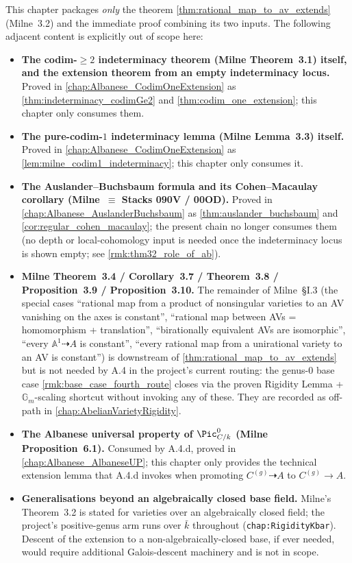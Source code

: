 This chapter packages \emph{only} the theorem
\cref{thm:rational_map_to_av_extends} (Milne~3.2) and the immediate proof combining its
two inputs. The following adjacent content is explicitly out of scope here:
\begin{itemize}
  \item \textbf{The codim-\(\geq 2\) indeterminacy theorem (Milne Theorem~3.1) itself,
    and the extension theorem from an empty indeterminacy locus.} Proved in
    \cref{chap:Albanese_CodimOneExtension} as \cref{thm:indeterminacy_codimGe2}
    and \cref{thm:codim_one_extension}; this chapter only consumes them.
  \item \textbf{The pure-codim-\(1\) indeterminacy lemma (Milne Lemma~3.3) itself.}
    Proved in \cref{chap:Albanese_CodimOneExtension} as
    \cref{lem:milne_codim1_indeterminacy}; this chapter only consumes it.
  \item \textbf{The Auslander--Buchsbaum formula and its Cohen--Macaulay corollary
    (Milne~\(\equiv\) Stacks 090V / 00OD).} Proved in
    \cref{chap:Albanese_AuslanderBuchsbaum} as \cref{thm:auslander_buchsbaum} and
    \cref{cor:regular_cohen_macaulay}; the present chain no longer consumes them
    (no depth or local-cohomology input is needed once the indeterminacy locus
    is shown empty; see \cref{rmk:thm32_role_of_ab}).
  \item \textbf{Milne Theorem~3.4 / Corollary~3.7 / Theorem~3.8 / Proposition~3.9 /
    Proposition~3.10.} The remainder of Milne~\S I.3 (the special cases ``rational map
    from a product of nonsingular varieties to an AV vanishing on the axes is constant'',
    ``rational map between AVs = homomorphism + translation'', ``birationally equivalent
    AVs are isomorphic'', ``every \(\mathbb A^1 \dashrightarrow A\) is constant'',
    ``every rational map from a unirational variety to an AV is constant'') is downstream
    of \cref{thm:rational_map_to_av_extends} but is not needed by A.4 in the project's
    current routing: the genus-\(0\) base case
    \cref{rmk:base_case_fourth_route} closes
    via the proven Rigidity Lemma + \(\mathbb G_m\)-scaling shortcut without invoking any of
    these. They are recorded as off-path in
    \cref{chap:AbelianVarietyRigidity}.
  \item \textbf{The Albanese universal property of \(\Pic^0_{C/k}\) (Milne Proposition~6.1).}
    Consumed by A.4.d, proved in \cref{chap:Albanese_AlbaneseUP}; this chapter only
    provides the technical extension lemma that A.4.d invokes when promoting
    \(C^{(g)} \dashrightarrow A\) to \(C^{(g)} \to A\).
  \item \textbf{Generalisations beyond an algebraically closed base field.} Milne's
    Theorem~3.2 is stated for varieties over an algebraically closed field; the
    project's positive-genus arm runs over \(\bar k\) throughout (\texttt{chap:RigidityKbar}).
    Descent of the extension to a non-algebraically-closed base, if ever needed, would
    require additional Galois-descent machinery and is not in scope.
\end{itemize}
